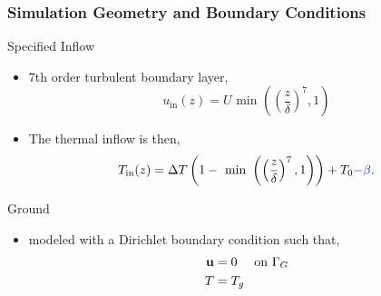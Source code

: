 \documentclass[mathserif]{beamer}
\begin{document}
%
%
%
\begin{frame}
\frametitle{Simulation Geometry and Boundary Conditions}

\begin{block}{Specified Inflow}

   \begin{itemize}
   \item 7th order turbulent boundary layer, 
     \begin{equation*}
       u_{\text{in}}(z) = U \text{ min }\left(\left(\frac{z}{\delta}\right)^7,1\right)
       \label{eq:bl_u}
     \end{equation*}
   \item The thermal inflow is then,
     \begin{equation*}
       T_{\text{in}}(z) = \Delta T \left(1- \text{ min
       }\left(\left(\frac{z}{\delta}\right)^7,1\right)\right)
       + T_0 \textcolor{blue}{- \beta}.  
     \end{equation*}
   \end{itemize}
\end{block}

\begin{block}{Ground}
  \begin{itemize}
    \item modeled with a Dirichlet boundary condition such that, 
      \begin{align*}
        {\bf u} &= 0 \quad \text{ on } \Gamma_G \\
        T &= T_g
      \end{align*}
  \end{itemize}
  \end{block}

\end{frame}
\end{document}
